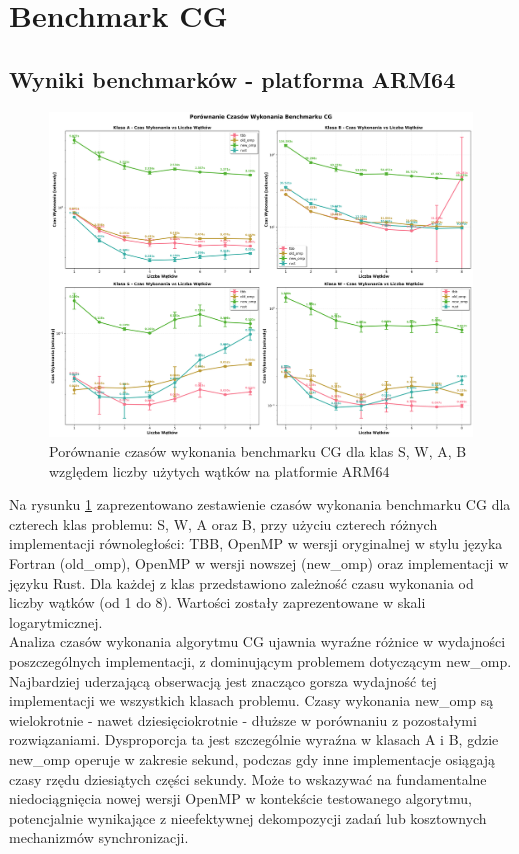 
\section{Benchmark CG}
\subsection{Wyniki benchmarków - platforma ARM64}

\begin{figure}[H]
    \centering
    \includegraphics[width=\textwidth]{analiza/images/parallel/cg/arm/cg_porownanie_czasow_wykonania.png}
    \caption{Porównanie czasów wykonania benchmarku CG dla klas S, W, A, B względem liczby użytych wątków na platformie ARM64}
    \label{cg_porownanie_czasow_wykonania}
\end{figure}

Na rysunku \ref{cg_porownanie_czasow_wykonania} zaprezentowano zestawienie czasów wykonania benchmarku CG dla czterech klas problemu: S, W, A oraz B, przy użyciu czterech różnych implementacji równoległości: TBB, OpenMP w wersji oryginalnej w stylu języka Fortran (old\_omp), OpenMP w wersji nowszej (new\_omp) oraz implementacji w języku Rust. Dla każdej z klas przedstawiono zależność czasu wykonania od liczby wątków (od 1 do 8). Wartości zostały zaprezentowane w skali logarytmicznej.\\
Analiza czasów wykonania algorytmu CG ujawnia wyraźne różnice w wydajności poszczególnych implementacji, z dominującym problemem dotyczącym new\_omp. Najbardziej uderzającą obserwacją jest znacząco gorsza wydajność tej implementacji we wszystkich klasach problemu. Czasy wykonania new\_omp są wielokrotnie - nawet dziesięciokrotnie - dłuższe w porównaniu z pozostałymi rozwiązaniami. Dysproporcja ta jest szczególnie wyraźna w klasach A i B, gdzie new\_omp operuje w zakresie sekund, podczas gdy inne implementacje osiągają czasy rzędu dziesiątych części sekundy. Może to wskazywać na fundamentalne niedociągnięcia nowej wersji OpenMP w kontekście testowanego algorytmu, potencjalnie wynikające z nieefektywnej dekompozycji zadań lub kosztownych mechanizmów synchronizacji.

